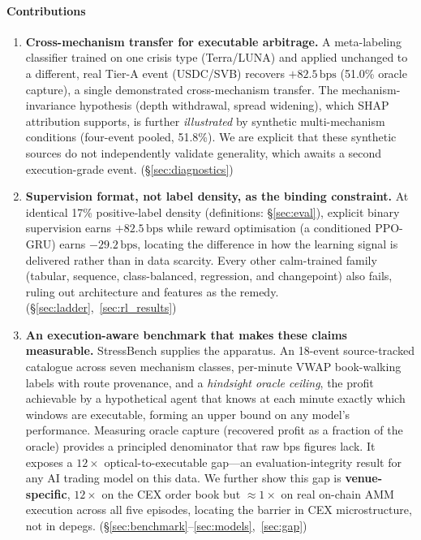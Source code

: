 \documentclass[sigconf,anonymous,natbib=false]{acmart}
\newcommand{\bps}{\,\text{bps}}
\begin{document}
\paragraph{Contributions}
\begin{enumerate}[leftmargin=*,itemsep=2pt,topsep=2pt]
  \item \textbf{Cross-mechanism transfer for executable arbitrage.}
        A meta-labeling classifier trained on one crisis type (Terra/LUNA) and
        applied unchanged to a different, real Tier-A event (USDC/SVB) recovers
        $+82.5\bps$ (51.0\% oracle capture), a single demonstrated cross-mechanism
        transfer. The mechanism-invariance hypothesis (depth withdrawal, spread
        widening), which SHAP attribution supports, is further \emph{illustrated} by
        synthetic multi-mechanism conditions (four-event pooled, 51.8\%). We are
        explicit that these synthetic sources do not independently validate
        generality, which awaits a second execution-grade event.
        (\S\ref{sec:diagnostics})
  \item \textbf{Supervision format, not label density, as the binding
        constraint.}
        At identical 17\% positive-label density (definitions:
        \S\ref{sec:eval}), explicit binary supervision earns $+82.5\bps$
        while reward optimisation
        (a conditioned PPO-GRU) earns $-29.2\bps$, locating the
        difference in how the learning signal is delivered rather than in
        data scarcity. Every other calm-trained family (tabular,
        sequence, class-balanced, regression, and changepoint) also
        fails, ruling out architecture and features as the remedy.
        (\S\ref{sec:ladder},~\ref{sec:rl_results})
  \item \textbf{An execution-aware benchmark that makes these claims
        measurable.}
        StressBench supplies the apparatus. An 18-event source-tracked catalogue
        across seven mechanism classes, per-minute VWAP book-walking labels with
        route provenance, and a \emph{hindsight oracle ceiling}, the profit
        achievable by a hypothetical agent that knows at each minute exactly which
        windows are executable, forming an upper bound on any model's performance.
        Measuring oracle capture (recovered profit as a fraction of the oracle)
        provides a principled denominator that raw bps figures lack. It
        exposes a $12\times$ optical-to-executable gap---an
        evaluation-integrity result for any AI trading model on this
        data. We further show this gap is
        \textbf{venue-specific}, $12\times$ on the CEX order book but
        $\approx\!1\times$ on real on-chain AMM execution across all five
        episodes, locating the barrier in CEX microstructure, not in depegs.
        (\S\ref{sec:benchmark}--\ref{sec:models},~\ref{sec:gap})
\end{enumerate}
\end{document}
